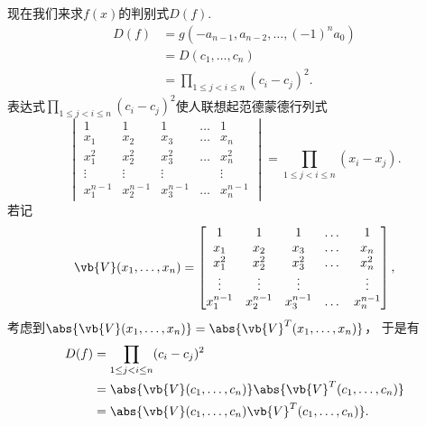 现在我们来求\(f(x)\)的判别式\(D(f)\).
\begin{align*}
	D(f)
	&= g(-a_{n-1},a_{n-2},\dotsc,(-1)^n a_0) \\
	&= D(c_1,\dotsc,c_n) \\
	&= \prod_{1\leq j<i\leq n} (c_i-c_j)^2.
\end{align*}
表达式\(\prod_{1\leq j<i\leq n} (c_i-c_j)^2\)使人联想起范德蒙德行列式\[
	\begin{vmatrix}
		1 & 1 & 1 & \dots & 1 \\
		x_1 & x_2 & x_3 & \dots & x_n \\
		x_1^2 & x_2^2 & x_3^2 & \dots & x_n^2 \\
		\vdots & \vdots & \vdots& & \vdots \\
		x_1^{n-1} & x_2^{n-1} & x_3^{n-1} & \dots & x_n^{n-1}
	\end{vmatrix}
	= \prod_{1 \leq j < i \leq n}(x_i-x_j).
\]
若记\[
	\vb{V}(x_1,\dotsc,x_n) = \begin{bmatrix}
		1 & 1 & 1 & \dots & 1 \\
		x_1 & x_2 & x_3 & \dots & x_n \\
		x_1^2 & x_2^2 & x_3^2 & \dots & x_n^2 \\
		\vdots & \vdots & \vdots& & \vdots \\
		x_1^{n-1} & x_2^{n-1} & x_3^{n-1} & \dots & x_n^{n-1}
	\end{bmatrix},
\]
考虑到\(\abs{\vb{V}(x_1,\dotsc,x_n)}=\abs{\vb{V}^T(x_1,\dotsc,x_n)}\)，
于是有\begin{align*}
	D(f)
	&= \prod_{1\leq j<i\leq n} (c_i-c_j)^2 \\
	&= \abs{\vb{V}(c_1,\dotsc,c_n)} \abs{\vb{V}^T(c_1,\dotsc,c_n)} \\
	&= \abs{\vb{V}(c_1,\dotsc,c_n) \vb{V}^T(c_1,\dotsc,c_n)}.
\end{align*}
